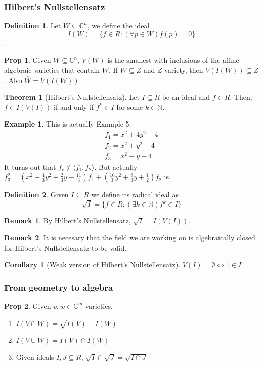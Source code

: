 \documentclass{article}
\theoremstyle{definition}
\newtheorem*{obs}{Remark}
\newtheorem{thm}{Theorem}
\newtheorem{cor}{Corollary}
\newtheorem*{prop}{Prop}
\newtheorem*{defn}{Definition}
\newtheorem{ex}{Example}
\newcommand{\N}{\mathbb{N}}
\newcommand{\C}{\mathbb{C}}
\begin{document}
\subsubsection{Hilbert's Nullstellensatz}
\begin{defn}
	Let $W\subseteq\C^n$, we define the ideal $$I(W)=\{f\in R:(\forall p\in W)f(p)=0\}$$.
\end{defn}
\begin{prop}
	Given $W\subseteq \C^n$, $V(W)$ is the smallest with inclusions of the affine algebraic varieties that contain $W$. If $W\subseteq Z$ and $Z$ variety, then $V(I(W))\subseteq Z$. Also $\bar W=V(I(W))$.
\end{prop}
\begin{thm}[Hilbert's Nullstellensatz]
		Let $I\subseteq R$ be an ideal and $f\in R$. Then, $f\in I(V(I))$ if and only if $f^k\in I$ for some $k\in \N$.
\end{thm}
\begin{ex} This is actually Example 5.
\begin{align*}
			f_1=x^2+4y^2-4\\
			f_2=x^2+y^2-4\\
			f_3=x^2-y-4
\end{align*}
It turns out that $f_r\notin\langle f_1,f_2\rangle$. But actually $f_3^2=(x^2+\frac{4}{3}y^2+\frac{2}{3}y-\frac{11}{3})f_1+(\frac{16}{3}y^2+\frac{8}{3}y+\frac{1}{2})f_2$ is.
\end{ex}
\begin{defn}
	Given $I\subseteq R$ we define its radical ideal as $$\sqrt{I}=\{f\in R:(\exists k\in \N)f^k\in I\}$$
\end{defn}
\begin{obs}
	By Hilbert's Nullstellensatz, $\sqrt I =I(V(I))$.
\end{obs}
\begin{obs}
	It is necesary that the field we are working on is algebraically closed for Hilbert's Nullstellensatz to be valid.
\end{obs}
\begin{cor}[Weak version of Hilbert's Nullstellensatz]
	$V(I)=\emptyset\iff 1\in I$
\end{cor}
\subsubsection{From geometry to algebra}
\begin{prop}
	Given $v,w\in \C^m$ varieties,
	\begin{enumerate}
		\item $I(V\cap W)=\sqrt{I(V)+I(W)}$
		\item $I(V\cup W)=I(V)\cap I(W)$
		\item Given ideals $I,J\subseteq R$, $\sqrt I\cap \sqrt J=\sqrt{I\cap J}$
	\end{enumerate}
\end{prop}
\end{document}

